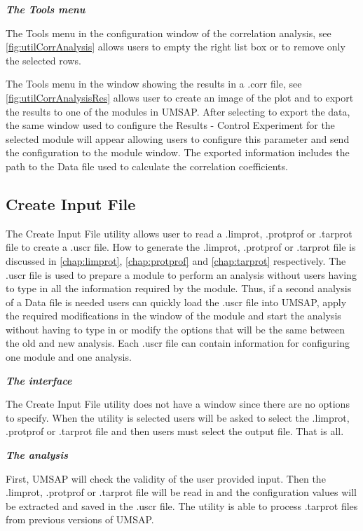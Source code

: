 \textit{\textbf{The Tools menu}}

The Tools menu in the configuration window of the correlation analysis, see \autoref{fig:utilCorrAnalysis} allows users to empty the right list box or to remove only the selected rows.

The Tools menu in the window showing the results in a .corr file, see \autoref{fig:utilCorrAnalysisRes} allows user to create an image of the plot and to export the results to one of the modules in UMSAP. After selecting to export the data, the same window used to configure the Results - Control Experiment for the selected module will appear allowing users to configure this parameter and send the configuration to the module window. The exported information includes the path to the Data file used to calculate the correlation coefficients.

\subsection{Create Input File}
\label{subsec:utilUscrFile}

The Create Input File utility allows user to read a .limprot, .protprof or .tarprot file to create a .uscr file. How to generate the .limprot, .protprof or .tarprot file is discussed in \autoref{chap:limprot}, \autoref{chap:protprof} and \autoref{chap:tarprot} respectively. The .uscr file is used to prepare a module to perform an analysis without users having to type in all the information required by the module. Thus, if a second analysis of a Data file is needed users can quickly load the .uscr file into UMSAP, apply the required modifications in the window of the module and start the analysis without having to type in or modify the options that will be the same between the old and new analysis. Each .uscr file can contain information for configuring one module and one analysis.

\textit{\textbf{The interface}}

The Create Input File utility does not have a window since there are no options to specify. When the utility is selected users will be asked to select the .limprot, .protprof or .tarprot file and then users must select the output file. That is all.

\textit{\textbf{The analysis}}

First, UMSAP will check the validity of the user provided input. Then the .limprot, .protprof or .tarprot file will be read in and the configuration values will be extracted and saved in the .uscr file. The utility is able to process .tarprot files from previous versions of UMSAP.

